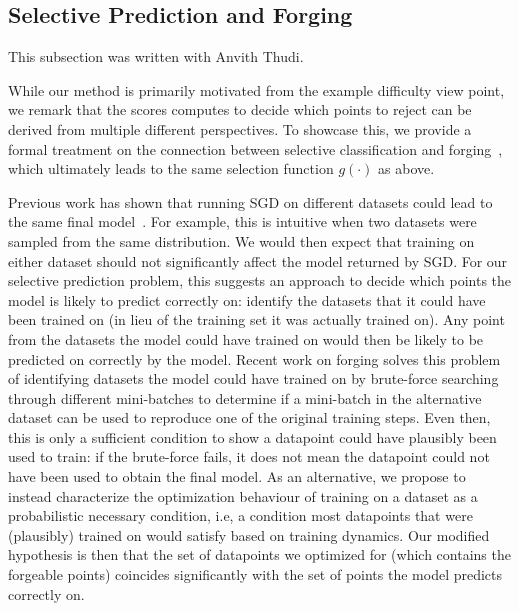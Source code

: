 \subsection{Selective Prediction and Forging}
\label{sec:forging}

\begin{contriback}
This subsection was written with Anvith Thudi.
\end{contriback}

While our \sptd method is primarily motivated from the example difficulty view point, we remark that the scores \sptd computes to decide which points to reject can be derived from multiple different perspectives. To showcase this, we provide a formal treatment on the connection between selective classification and forging~\citep{thudi2022necessity}, which ultimately leads to the same selection function $g(\cdot)$ as above.

Previous work has shown that running SGD on different datasets could lead to the same final model~\citep{hardt2016train,bassily2020stability,thudi2022necessity}. For example, this is intuitive when two datasets were sampled from the same distribution. We would then expect that training on either dataset should not significantly affect the model returned by SGD. For our selective prediction problem, this suggests an approach to decide which points the model is likely to predict correctly on: identify the datasets that it could have been trained on (in lieu of the training set it was actually trained on). Any point from the datasets the model could have trained on would then be likely to be predicted on correctly by the model. %
Recent work on forging \cite{thudi2022necessity} solves this problem of identifying datasets the model could have trained on by brute-force searching through different mini-batches to determine if a mini-batch in the alternative dataset can be used to reproduce one of the original training steps. Even then, this is only a sufficient condition to show a datapoint could have plausibly been used to train: if the brute-force fails, it does not mean the datapoint could not have been used to obtain the final model. As an alternative, we propose to instead characterize the optimization behaviour of training on a dataset as a probabilistic necessary condition, i.e, a condition most datapoints that were (plausibly) trained on would satisfy based on training dynamics. Our modified hypothesis is then that the set of datapoints we optimized for (which contains the forgeable points) coincides significantly with the set of points the model predicts correctly on.


